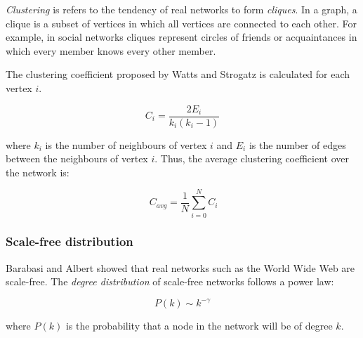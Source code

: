 \documentclass[a4paper,11pt,titlepage]{article}
\begin{document}
\emph{Clustering} is refers to the tendency of real networks to form
\emph{cliques}. In a graph, a clique is a subset of vertices in which all
vertices are connected to each other. For example, in social networks
cliques represent circles of friends or acquaintances in which every
member knows every other member.

The clustering coefficient proposed by Watts and Strogatz is calculated for each
vertex $i$.

\[ C_i = \frac{2E_i}{k_i(k_i-1)} \]

where $k_i$ is the number of neighbours of vertex $i$ and $E_i$ is the number
of edges between the neighbours of vertex $i$. Thus, the average clustering
coefficient over the network is:

\[ \ C_{avg} = \frac{1}{N}\sum_{i=0}^{N} C_i \]

\subsubsection{Scale-free distribution}
\label{sec:scale-free}

Barabasi and Albert showed that real networks such as the World Wide Web are
scale-free. The \emph{degree distribution} of scale-free networks follows a
power law:

\[ P(k) \sim k^{-\gamma} \]

where $P(k)$ is the probability that a node in the network will be of degree $k$.






\end{document}
